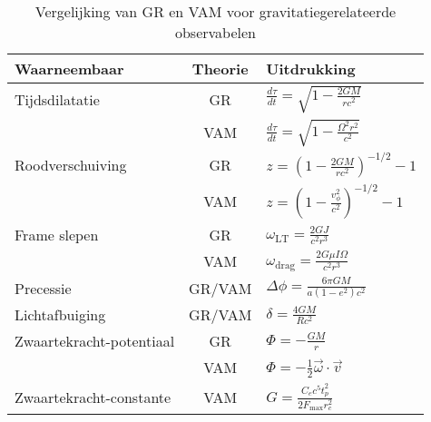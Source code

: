 \begin{table}[ht]
    \centering
    \caption{Vergelijking van GR en VAM voor gravitatiegerelateerde observabelen}
    \label{tab:VAM-GR}
    \begin{tabular}{|l|c|l|}
        \hline
        \textbf{Waarneembaar} & \textbf{Theorie} & \textbf{Uitdrukking} \\
        \hline
        Tijdsdilatatie & GR & $  \frac{d\tau}{dt} = \sqrt{1 - \frac{2GM}{rc^2}} $ \\
        & VAM & $  \frac{d\tau}{dt} = \sqrt{1 - \frac{\Omega^2 r^2}{c^2}} $ \\
        \hline
        Roodverschuiving & GR & $  z = \left(1 - \frac{2GM}{rc^2} \right)^{-1/2} - 1 $ \\
        & VAM & $  z = \left(1 - \frac{v_\phi^2}{c^2} \right)^{-1/2} - 1 $ \\
        \hline
        Frame slepen & GR & $  \omega_{\text{LT}} = \frac{2GJ}{c^2 r^3} $ \\
        & VAM & $  \omega_{\text{drag}} = \frac{2G \mu I \Omega}{c^2 r^3} $ \\
        \hline
        Precessie & GR/VAM & $  \Delta\phi = \frac{6\pi GM}{a(1 - e^2)c^2} $ \\
        \hline
        Lichtafbuiging & GR/VAM & $  \delta = \frac{4GM}{Rc^2} $ \\
        \hline
        Zwaartekracht-potentiaal & GR & $  \Phi = -\frac{GM}{r} $ \\
        & VAM & $  \Phi = -\frac{1}{2} \vec{\omega} \cdot \vec{v} $ \\
        \hline
        Zwaartekracht-constante & VAM & $  G = \frac{C_e c^5 t_p^2}{2 F_{\max} r_c^2} $ \\
        \hline
    \end{tabular}
\end{table}